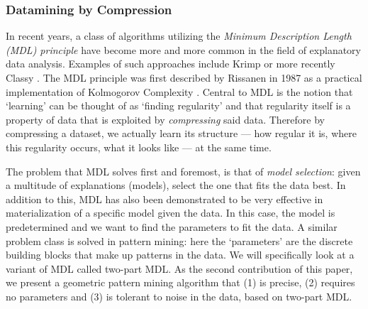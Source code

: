 \documentclass{llncs}
\begin{document}


\subsubsection{Datamining by Compression}
 
In recent years, a class of algorithms utilizing the \emph{Minimum Description Length (MDL) principle} \cite{rissanenmdl,grunwaldmdl} have become more and more common in the field of explanatory data analysis. Examples of such approaches include Krimp \cite{krimp} or more recently Classy \cite{classy}. The  MDL principle was first described by Rissanen in 1987 \cite{rissanenmdl} as a practical implementation of Kolmogorov Complexity \cite{kolmogorov}. Central to MDL is the notion that `learning' can be thought of as `finding regularity' and that regularity itself is a property of data that is exploited by \emph{compressing} said data. Therefore by compressing a dataset, we actually learn its structure --- how regular it is, where this regularity occurs, what it looks like --- at the same time. %

The problem that MDL solves first and foremost, is that of \emph{model selection}: given a multitude of explanations (models), select the one that fits the data best. In addition to this, MDL has also been demonstrated to be very effective in materialization of a specific model given the data. In this case, the model is predetermined and we want to find the parameters to fit the data. A similar problem class is solved in pattern mining: here the `parameters' are the discrete building blocks that make up patterns in the data. We will specifically look at a variant of MDL called two-part MDL. As the second contribution of this paper, we present a geometric pattern mining algorithm that (1) is precise, (2) requires no parameters and (3) is tolerant to noise in the data, based on two-part MDL.
 
\end{document}
